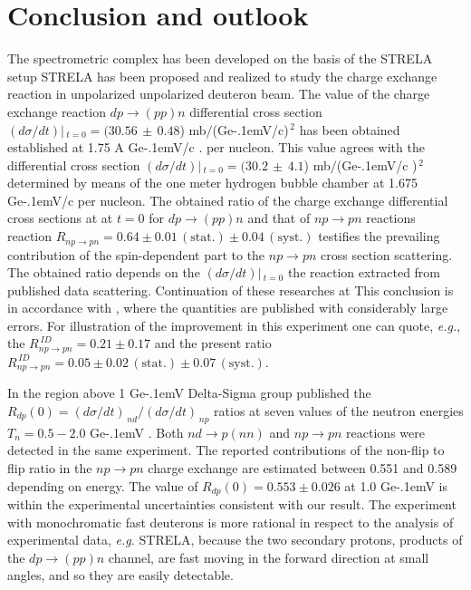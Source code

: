 \documentclass[twocolumn,epjc3]{svjour3}
\newcommand{\np}     {\ensuremath{np \rightarrow pn}\xspace}
\newcommand{\dpchex} {\ensuremath{dp \rightarrow (pp)n}\xspace}
\newcommand{\GeVc}   {Ge\kern-.1emV/c\xspace}
\newcommand{\GeV}    {Ge\kern-.1emV\xspace}
\providecommand{\DIFaddtex}[1]{{\protect\color{Green} \sf #1}} %
\providecommand{\DIFdeltex}[1]{{\protect\color{Red} \scriptsize #1}} %
\providecommand{\DIFaddbegin}{} %
\providecommand{\DIFaddend}{} %
\providecommand{\DIFdelbegin}{} %
\providecommand{\DIFdelend}{} %
\providecommand{\DIFadd}[1]{\texorpdfstring{\DIFaddtex{#1}}{#1}} %
\providecommand{\DIFdel}[1]{\texorpdfstring{\DIFdeltex{#1}}{}} %
\newcommand{\DIFscaledelfig}{0.5}
\newlength{\DIFdelgraphicswidth} %
\newlength{\DIFdelgraphicsheight} %
\newcommand{\DIFaddincludegraphics}[2][]{{\color{blue}\fbox{\DIFOincludegraphics[#1]{#2}}}} %
\newcommand{\DIFdelincludegraphics}[2][]{%
\sbox{\DIFdelgraphicsbox}{\DIFOincludegraphics[#1]{#2}}%
\settoboxwidth{\DIFdelgraphicswidth}{\DIFdelgraphicsbox} %
\settoboxtotalheight{\DIFdelgraphicsheight}{\DIFdelgraphicsbox} %
\scalebox{\DIFscaledelfig}{%
\parbox[b]{\DIFdelgraphicswidth}{\usebox{\DIFdelgraphicsbox}\\[-\baselineskip] \rule{\DIFdelgraphicswidth}{0em}}\llap{\resizebox{\DIFdelgraphicswidth}{\DIFdelgraphicsheight}{%
\setlength{\unitlength}{\DIFdelgraphicswidth}%
\begin{picture}(1,1)%
\thicklines\linethickness{2pt} %
{\color[rgb]{1,0,0}\put(0,0){\framebox(1,1){}}}%
{\color[rgb]{1,0,0}\put(0,0){\line( 1,1){1}}}%
{\color[rgb]{1,0,0}\put(0,1){\line(1,-1){1}}}%
\end{picture}%
}\hspace*{3pt}}} %
} %
\DeclareRobustCommand{\DIFaddbegin}{\DIFOaddbegin \let\includegraphics\DIFaddincludegraphics} %
\DeclareRobustCommand{\DIFaddend}{\DIFOaddend \let\includegraphics\DIFOincludegraphics} %
\DeclareRobustCommand{\DIFdelbegin}{\DIFOdelbegin \let\includegraphics\DIFdelincludegraphics} %
\DeclareRobustCommand{\DIFdelend}{\DIFOaddend \let\includegraphics\DIFOincludegraphics} %
\begin{document}
\section{Conclusion \DIFaddbegin \DIFadd{and outlook}\DIFaddend }
The spectrometric complex \DIFdelbegin \DIFdel{has been developed on the basis of the STRELA setup }\DIFdelend \DIFaddbegin \DIFadd{STRELA has been proposed and realized }\DIFaddend to study the
charge exchange reaction in \DIFdelbegin \DIFdel{unpolarized }\DIFdelend \DIFaddbegin \DIFadd{unpola\-rized }\DIFaddend deuteron beam. The value of the charge
exchange reaction \dpchex differential cross section
$(d\sigma/dt)|\,_{t=0}=(30.56\,\pm\,0.48$) mb$/$(\GeVc)$^{\,2}$ has been
\DIFdelbegin \DIFdel{obtained }\DIFdelend \DIFaddbegin \DIFadd{established }\DIFaddend at 1.75 \DIFdelbegin \DIFdel{A }\DIFdelend \GeVc \DIFdelbegin \DIFdel{. }\DIFdelend \DIFaddbegin \DIFadd{per nucleon. This value agrees with the differential
cross section $(d\sigma/dt)|\,_{t=0}=(30.2\,\pm\,4.1$) mb$/$(}\GeVc\DIFadd{)$^{\,2}$
determined by means of the one meter hydrogen bubble chamber at 1.675 }\GeVc \DIFadd{per
nucleon. }\DIFaddend The obtained ratio of the charge exchange differential cross sections
at \DIFdelbegin %
\DIFdel{at }\DIFdelend $t=0$ for \dpchex and \DIFaddbegin \DIFadd{that of }\DIFaddend \np \DIFdelbegin \DIFdel{reactions
}\DIFdelend \DIFaddbegin \DIFadd{reaction
}\DIFaddend $R_{\np} = 0.64 \pm 0.01\,\mathrm{(stat.)} \pm 0.04\,\mathrm{(syst.)}$ testifies
the prevailing contribution of the spin-dependent part to the \np \DIFdelbegin \DIFdel{cross section
scattering.
The obtained ratio depends on the $(d\sigma/dt)|\,_{t=0}$ the }%
\DIFdel{reaction extracted from published data }\DIFdelend \DIFaddbegin \DIFadd{scattering}\DIFaddend .
\DIFdelbegin \DIFdel{Continuation of these researches at
}\DIFdelend \DIFaddbegin \DIFadd{This conclusion is in accordance with \cite{gla08}, where the quantities are
published with considerably large errors. For illustration of the improvement in
this experiment one can quote, \textit{e.g.}, the
$R^{\,ID}_{\np} = 0.21 \pm 0.17$ \cite{gla08} and the present ratio
$R^{\,ID}_{\np} = 0.05 \pm 0.02\,\mathrm{(stat.)} \pm 0.07\,\mathrm{(syst.)}$.
}

\DIFadd{In the region above 1 }\GeV \DIFadd{Delta-Sigma group published the
$R_{dp}(0) = (d\sigma/dt)_{\,nd} / (d\sigma/dt)_{\,np}$ ratios
\cite{sha09,sha09_2,shi11} at seven values of the neutron energies
$T_n = 0.5 - 2.0$ }\GeV\DIFadd{. Both $nd \rightarrow p(nn)$ and }\np \DIFadd{reactions were
detected in the same experiment. The reported contributions of the non-flip to
flip ratio in the }\np \DIFadd{charge exchange are estimated between 0.551 and 0.589
depending on energy. The value of $R_{dp}(0) = 0.553 \pm 0.026$ at 1.0 }\GeV
\DIFadd{\cite{sha09} is within the experimental uncertainties consistent with our
result. The experiment with monochromatic fast deuterons is more rational in
respect to the analysis of experimental data, \textit{e.g.} STRELA, because the
two secondary protons, products of the }\dpchex \DIFadd{channel, are fast moving in the
forward direction at small angles, and so they are easily detectable.
}
\end{document}
